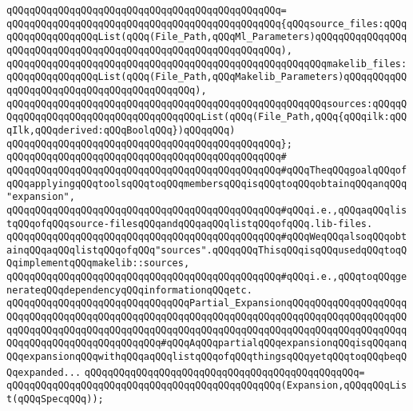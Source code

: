 \verb|qQQqqQQqqQQqqQQqqQQqqQQqqQQqqQQqqQQqqQQqqQQqqQQq=|\newline
\verb|qQQqqQQqqQQqqQQqqQQqqQQqqQQqqQQqqQQqqQQqqQQqqQQq{qQQqsource_files:qQQqqQQqqQQqqQQqqQQqList(qQQq(File_Path,qQQqMl_Parameters)qQQqqQQqqQQqqQQqqQQqqQQqqQQqqQQqqQQqqQQqqQQqqQQqqQQqqQQqqQQqqQQq),|\newline
\verb|qQQqqQQqqQQqqQQqqQQqqQQqqQQqqQQqqQQqqQQqqQQqqQQqqQQqqQQqmakelib_files:qQQqqQQqqQQqqQQqList(qQQq(File_Path,qQQqMakelib_Parameters)qQQqqQQqqQQqqQQqqQQqqQQqqQQqqQQqqQQqqQQqqQQq),|\newline
\verb|qQQqqQQqqQQqqQQqqQQqqQQqqQQqqQQqqQQqqQQqqQQqqQQqqQQqqQQqsources:qQQqqQQqqQQqqQQqqQQqqQQqqQQqqQQqqQQqqQQqList(qQQq(File_Path,qQQq{qQQqilk:qQQqIlk,qQQqderived:qQQqBoolqQQq})qQQqqQQq)|\newline
\verb|qQQqqQQqqQQqqQQqqQQqqQQqqQQqqQQqqQQqqQQqqQQqqQQq};|\newline
\verb|qQQqqQQqqQQqqQQqqQQqqQQqqQQqqQQqqQQqqQQqqQQqqQQq#|\newline
\verb|qQQqqQQqqQQqqQQqqQQqqQQqqQQqqQQqqQQqqQQqqQQqqQQq#qQQqTheqQQqgoalqQQqofqQQqapplyingqQQqtoolsqQQqtoqQQqmembersqQQqisqQQqtoqQQqobtainqQQqanqQQq"expansion",|\newline
\verb|qQQqqQQqqQQqqQQqqQQqqQQqqQQqqQQqqQQqqQQqqQQqqQQq#qQQqi.e.,qQQqaqQQqlistqQQqofqQQqsource-filesqQQqandqQQqaqQQqlistqQQqofqQQq.lib-files.|\newline
\verb|qQQqqQQqqQQqqQQqqQQqqQQqqQQqqQQqqQQqqQQqqQQqqQQq#qQQqWeqQQqalsoqQQqobtainqQQqaqQQqlistqQQqofqQQq"sources".qQQqqQQqThisqQQqisqQQqusedqQQqtoqQQqimplementqQQqmakelib::sources,|\newline
\verb|qQQqqQQqqQQqqQQqqQQqqQQqqQQqqQQqqQQqqQQqqQQqqQQq#qQQqi.e.,qQQqtoqQQqgenerateqQQqdependencyqQQqinformationqQQqetc.|\newline
\newline
\newline
\verb|qQQqqQQqqQQqqQQqqQQqqQQqqQQqqQQqPartial_ExpansionqQQqqQQqqQQqqQQqqQQqqQQqqQQqqQQqqQQqqQQqqQQqqQQqqQQqqQQqqQQqqQQqqQQqqQQqqQQqqQQqqQQqqQQqqQQqqQQqqQQqqQQqqQQqqQQqqQQqqQQqqQQqqQQqqQQqqQQqqQQqqQQqqQQqqQQqqQQqqQQqqQQqqQQqqQQqqQQqqQQqqQQqqQQq#qQQqAqQQqpartialqQQqexpansionqQQqisqQQqanqQQqexpansionqQQqwithqQQqaqQQqlistqQQqofqQQqthingsqQQqyetqQQqtoqQQqbeqQQqexpanded...|\newline
\verb|qQQqqQQqqQQqqQQqqQQqqQQqqQQqqQQqqQQqqQQqqQQqqQQq=|\newline
\verb|qQQqqQQqqQQqqQQqqQQqqQQqqQQqqQQqqQQqqQQqqQQqqQQq(Expansion,qQQqqQQqList(qQQqSpecqQQq));|\newline
\newline
